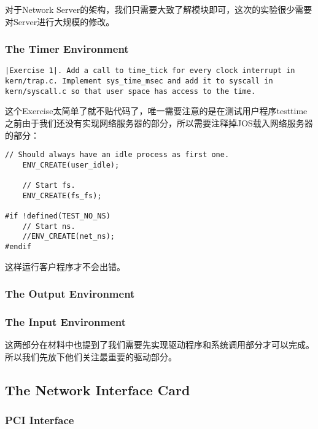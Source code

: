 \documentclass{article}
\begin{document}
\begin{CJK*}{UTF8}{gkai}
对于Network Server的架构，我们只需要大致了解模块即可，这次的实验很少需要对Server进行大规模的修改。

\subsubsection{The Timer Environment}

\begin{lstlisting}[style=exercise]
|Exercise 1|. Add a call to time_tick for every clock interrupt in kern/trap.c. Implement sys_time_msec and add it to syscall in kern/syscall.c so that user space has access to the time.
\end{lstlisting}

这个Exercise太简单了就不贴代码了，唯一需要注意的是在测试用户程序testtime之前由于我们还没有实现网络服务器的部分，所以需要注释掉JOS载入网络服务器的部分：

\begin{lstlisting}[style=ccode, title={\scriptsize \ttfamily \bfseries kern/init.c: i386\_init()}]
	// Should always have an idle process as first one.
	ENV_CREATE(user_idle);

	// Start fs.
	ENV_CREATE(fs_fs);

#if !defined(TEST_NO_NS)
	// Start ns.
	//ENV_CREATE(net_ns);
#endif
\end{lstlisting}

这样运行客户程序才不会出错。


\subsubsection{The Output Environment}

\subsubsection{The Input Environment}

这两部分在材料中也提到了我们需要先实现驱动程序和系统调用部分才可以完成。所以我们先放下他们关注最重要的驱动部分。

\subsection{The Network Interface Card}

\subsubsection{PCI Interface}


\end{CJK*}
\end{document}
